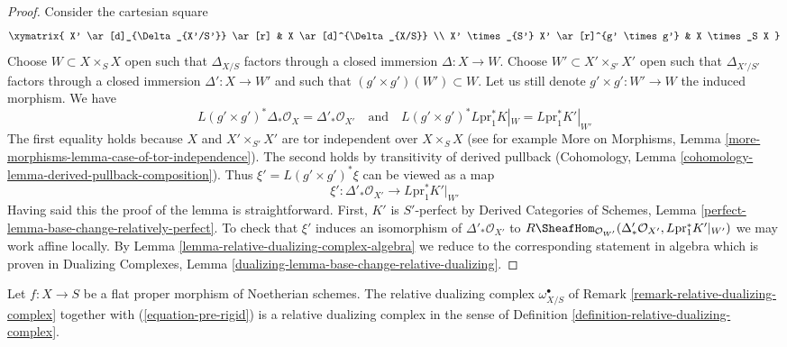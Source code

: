 \begin{proof}
Consider the cartesian square
$$
\xymatrix{
X' \ar[d]_{\Delta_{X'/S'}} \ar[r] & X \ar[d]^{\Delta_{X/S}} \\
X' \times_{S'} X' \ar[r]^{g' \times g'} & X \times_S X
}
$$
Choose $W \subset X \times_S X$ open such that $\Delta_{X/S}$
factors through a closed immersion $\Delta : X \to W$.
Choose $W' \subset X' \times_{S'} X'$ open such that $\Delta_{X'/S'}$
factors through a closed immersion $\Delta' : X \to W'$
and such that $(g' \times g')(W') \subset W$. Let us still denote
$g' \times g' : W' \to W$ the induced morphism. We have
$$
L(g' \times g')^*\Delta_*\mathcal{O}_X =
\Delta'_*\mathcal{O}_{X'}
\quad\text{and}\quad
L(g' \times g')^*L\text{pr}_1^*K|_W =
L\text{pr}_1^*K'|_{W'}
$$
The first equality holds because $X$ and $X' \times_{S'} X'$
are tor independent over $X \times_S X$ (see for example
More on Morphisms, Lemma \ref{more-morphisms-lemma-case-of-tor-independence}).
The second holds by transitivity of derived pullback
(Cohomology, Lemma \ref{cohomology-lemma-derived-pullback-composition}).
Thus $\xi' = L(g' \times g')^*\xi$ can be viewed as a map
$$
\xi' : \Delta'_*\mathcal{O}_{X'} \longrightarrow L\text{pr}_1^*K'|_{W'}
$$
Having said this the proof of the lemma is straightforward.
First, $K'$ is $S'$-perfect by Derived Categories of Schemes, Lemma
\ref{perfect-lemma-base-change-relatively-perfect}.
To check that $\xi'$ induces an isomorphism
of $\Delta'_*\mathcal{O}_{X'}$ to
$R\SheafHom_{\mathcal{O}_{W'}}(
\Delta'_*\mathcal{O}_{X'}, L\text{pr}_1^*K'|_{W'})$
we may work affine locally. By
Lemma \ref{lemma-relative-dualizing-complex-algebra}
we reduce to the corresponding statement in algebra
which is proven in Dualizing Complexes, Lemma
\ref{dualizing-lemma-base-change-relative-dualizing}.
\end{proof}

\begin{lemma}
\label{lemma-flat-proper-relative-dualizing}
Let $f : X \to S$ be a flat proper morphism of Noetherian schemes.
The relative dualizing complex $\omega_{X/S}^\bullet$ of
Remark \ref{remark-relative-dualizing-complex}
together with (\ref{equation-pre-rigid}) is a relative
dualizing complex in the sense of
Definition \ref{definition-relative-dualizing-complex}.
\end{lemma}

